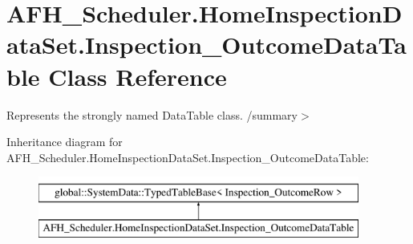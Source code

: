 \section{A\+F\+H\+\_\+\+Scheduler.\+Home\+Inspection\+Data\+Set.\+Inspection\+\_\+\+Outcome\+Data\+Table Class Reference}
\label{class_a_f_h___scheduler_1_1_home_inspection_data_set_1_1_inspection___outcome_data_table}


Represents the strongly named Data\+Table class. /summary$>$  


Inheritance diagram for A\+F\+H\+\_\+\+Scheduler.\+Home\+Inspection\+Data\+Set.\+Inspection\+\_\+\+Outcome\+Data\+Table\+:\begin{figure}[H]
\begin{center}
\leavevmode
\includegraphics[height=2.000000cm]{class_a_f_h___scheduler_1_1_home_inspection_data_set_1_1_inspection___outcome_data_table}
\end{center}
\end{figure}

